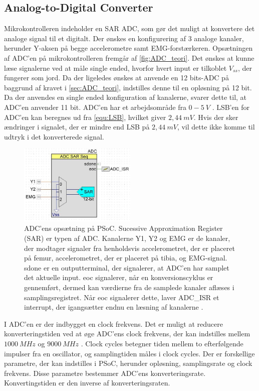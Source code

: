 \subsection{Analog-to-Digital Converter} \label{sec:ADC_imp}
Mikrokontrolleren indeholder en SAR ADC, som gør det muligt at konvertere det analoge signal til et digitalt. Der ønskes en konfigurering af 3 analoge kanaler, herunder Y-aksen på begge accelerometre samt EMG-forstærkeren. Opsætningen af ADC'en på mikrokontrolleren fremgår af \autoref{fig:ADC_teori}. Det ønskes at kunne læse signalerne ved at måle single ended, hvorfor hvert input er tilkoblet $V_{ss}$, der fungerer som jord. Da der ligeledes ønskes at anvende en 12 bits-ADC på baggrund af kravet i \autoref{sec:ADC_teori}, indstilles denne til en opløsning på 12 bit. Da der anvendes en single ended konfiguration af kanalerne, svarer dette til, at ADC'en anvender 11 bit. ADC'en har et arbejdsområde fra $0-5~V$ \citep{ADC2014}. LSB'en for ADC'en kan beregnes ud fra \autoref{equ:LSB}, hvilket giver $2,44~mV$. Hvis der sker ændringer i signalet, der er mindre end LSB på $2,44~mV$, vil dette ikke komme til udtryk i det konverterede signal. 


\begin{figure}[H]
\centering
\includegraphics[width=0.5\textwidth]{figures/implementering/ADC_imp.jpg}
\caption{ADC'ens opsætning på PSoC. Sucessive Approximation Register (SAR) er typen af ADC. Kanalerne Y1, Y2 og EMG er de kanaler, der modtager signaler fra henholdsvis accelerometret, der er placeret på femur, accelerometret, der er placeret på tibia, og EMG-signal. sdone er en outputterminal, der signalerer, at ADC'en har samplet det aktuelle input. eoc signalerer, når en konversionscyklus er gennemført, dermed kan værdierne fra de samplede kanaler aflæses i samplingsregistret. Når eoc signalerer dette, laver ADC\_ISR et interrupt, der igangsætter endnu en læsning af kanalerne \citep{ADC2014}.}
\label{fig:ADC_teori}
\end{figure}

\noindent
I ADC'en er der indbygget en clock frekvens. Det er muligt at reducere konverteringstiden ved at øge ADC'ens clock frekvens, der kan indstilles mellem $1000~MHz$ og $9000~MHz$ \citep{ADC2014}. Clock cycles betegner tiden mellem to efterfølgende impulser fra en oscillator, og samplingtiden måles i clock cycles. Der er forskellige parametre, der kan indstilles i PSoC, herunder opløsning, samplingsrate og clock frekvens. Disse parametre bestemmer ADC'ens konverteringsrate. Konvertingstiden er den inverse af konverteringsraten. 

